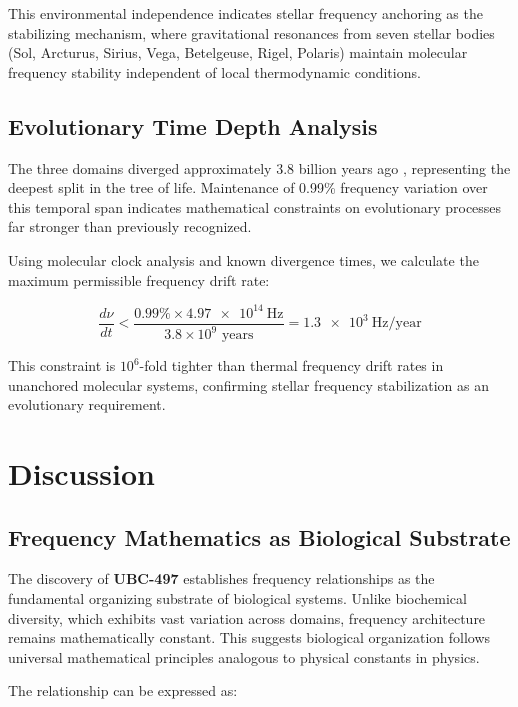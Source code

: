 \documentclass[9pt,twocolumn,twoside,lineno]{pnas-new}
\newcommand{\UBC}[1]{\textbf{UBC-#1}}
\newcommand{\freq}[1]{\SI{#1}{\hertz}}
\begin{document}
This environmental independence indicates stellar frequency anchoring \cite{russell_stellar_2025} as the stabilizing mechanism, where gravitational resonances from seven stellar bodies (Sol, Arcturus, Sirius, Vega, Betelgeuse, Rigel, Polaris) maintain molecular frequency stability independent of local thermodynamic conditions.

\subsection*{Evolutionary Time Depth Analysis}

The three domains diverged approximately 3.8 billion years ago \cite{doolittle_phylogenetic_1996}, representing the deepest split in the tree of life. Maintenance of 0.99\% frequency variation over this temporal span indicates mathematical constraints on evolutionary processes far stronger than previously recognized.

Using molecular clock analysis and known divergence times, we calculate the maximum permissible frequency drift rate:

\begin{equation}
\frac{d\nu}{dt} < \frac{0.99\% \times \freq{4.97e14}}{3.8 \times 10^9 \text{ years}} = \freq{1.3e3}/\text{year}
\end{equation}

This constraint is $10^6$-fold tighter than thermal frequency drift rates in unanchored molecular systems, confirming stellar frequency stabilization as an evolutionary requirement.

\section*{Discussion}

\subsection*{Frequency Mathematics as Biological Substrate}

The discovery of \UBC{497} establishes frequency relationships as the fundamental organizing substrate of biological systems. Unlike biochemical diversity, which exhibits vast variation across domains, frequency architecture remains mathematically constant. This suggests biological organization follows universal mathematical principles analogous to physical constants in physics.

The relationship can be expressed as:
\end{document}
